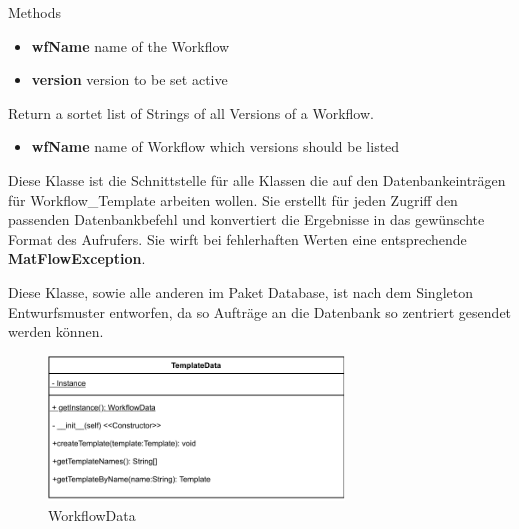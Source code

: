 \begin{methodenv}{Methods}
\begin{itemize}
	\item \textbf{wfName}
	name of the Workflow
	\item \textbf{version}
	version to be set active
\end{itemize}

Return a sortet list of Strings of all Versions of a Workflow.

\begin{itemize}
	\item \textbf{wfName}
	name of Workflow which versions should be listed
\end{itemize}

\end{methodenv}


Diese Klasse ist die Schnittstelle für alle Klassen die auf den Datenbankeinträgen für Workflow\_Template arbeiten wollen. Sie erstellt für jeden Zugriff den passenden Datenbankbefehl und konvertiert die Ergebnisse in das gewünschte Format des Aufrufers.
Sie wirft bei fehlerhaften Werten eine entsprechende \textbf{MatFlowException}.

Diese Klasse, sowie alle anderen im Paket Database, ist nach dem Singleton Entwurfsmuster entworfen, da so Aufträge an die Datenbank so zentriert gesendet werden können.
\begin{figure}[h]
	\centering
	\includegraphics[width=0.7\textwidth]{res/Klassen/TemplateData.pdf} 
	\caption{WorkflowData}
	\label{fig:workflowDataClass}
\end{figure}

